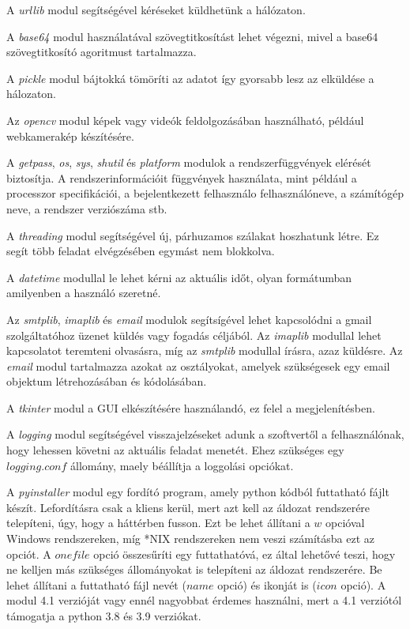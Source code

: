 \documentclass[12pt,a4paper,oneside]{report}
\begin{document}
A \emph{urllib} modul segítségével kéréseket küldhetünk a hálózaton.

A \emph{base64} modul használatával szövegtitkosítást lehet végezni, mivel a base64 szövegtitkosító agoritmust tartalmazza.

A \emph{pickle} modul bájtokká tömöríti az adatot így gyorsabb lesz az elküldése a hálozaton.

Az \emph{opencv} modul képek vagy videók feldolgozásában használható, például webkamerakép készítésére.

A \emph{getpass}, \emph{os}, \emph{sys}, \emph{shutil} és \emph{platform} modulok a rendszerfüggvények elérését biztosítja. A rendszerinformációit függvények használata, mint például a processzor specifikációi, a bejelentkezett felhasználo felhasználóneve, a számítógép neve, a rendszer verziószáma stb.

A \emph{threading} modul segítségével új, párhuzamos szálakat hoszhatunk létre. Ez segít több feladat elvégzésében egymást nem blokkolva.

A \emph{datetime} modullal le lehet kérni az aktuális időt, olyan formátumban amilyenben a használó szeretné. %

Az \emph{smtplib}, \emph{imaplib} és \emph{email} modulok segítsígével lehet kapcsolódni a gmail szolgáltatóhoz üzenet küldés vagy fogadás céljából. Az \emph{imaplib} modullal lehet kapcsolatot teremteni olvasásra, míg az \emph{smtplib} modullal írásra, azaz küldésre. Az \emph{email} modul tartalmazza azokat az osztályokat, amelyek szükségesek egy email objektum létrehozásában és kódolásában.

A \emph{tkinter} modul a GUI elkészítésére használandó, ez felel a megjelenítésben.

A \emph{logging} modul segítségével visszajelzéseket adunk a szoftvertől a felhasználónak, hogy lehessen követni az aktuális feladat menetét. Ehez szükséges egy $logging.conf$ állomány, maely béállítja a loggolási opciókat.

A \emph{pyinstaller} modul egy fordító program, amely python kódból futtatható fájlt készít. Lefordításra csak a kliens kerül, mert azt kell az áldozat rendszerére telepíteni, úgy, hogy a háttérben fusson. Ezt be lehet állítani a $w$ opcióval Windows rendszereken, míg *NIX rendszereken nem veszi számításba ezt az opciót. A $onefile$ opció összesűríti egy futtathatóvá, ez által lehetővé teszi, hogy ne kelljen más szükséges állományokat is telepíteni az áldozat rendszerére. Be lehet állítani a futtatható fájl nevét ($name$ opció) és ikonját is ($icon$ opció). A modul 4.1 verzióját vagy ennél nagyobbat érdemes használni, mert a 4.1 verziótól támogatja a python 3.8 és 3.9 verziókat.
\end{document}
